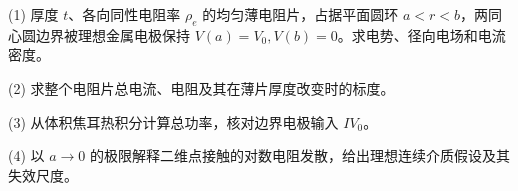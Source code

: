(1) 厚度 \(t\)、各向同性电阻率 \(\rho_e\) 的均匀薄电阻片，占据平面圆环 \(a<r<b\)，两同心圆边界被理想金属电极保持 \(V(a)=V_0,V(b)=0\)。求电势、径向电场和电流密度。

(2) 求整个电阻片总电流、电阻及其在薄片厚度改变时的标度。

(3) 从体积焦耳热积分计算总功率，核对边界电极输入 \(IV_0\)。

(4) 以 \(a\to0\) 的极限解释二维点接触的对数电阻发散，给出理想连续介质假设及其失效尺度。
